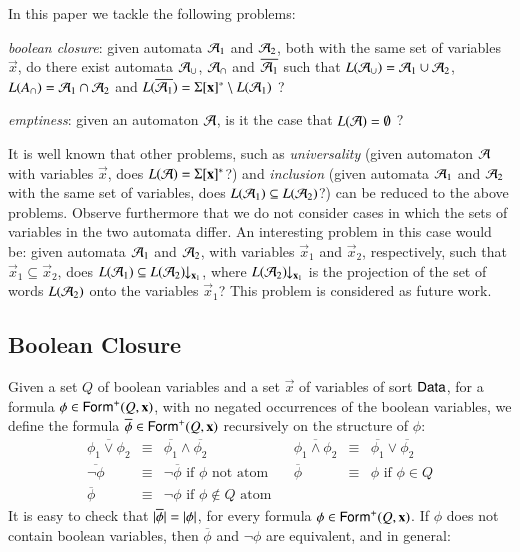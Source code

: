 \documentclass[10pt,conference,letterpaper,twocolumn]{IEEEtran}
\begin{document}
In this paper we tackle the following problems: \begin{compactenum}
\item \emph{boolean closure}: given automata $\mathcal{A}_1$ and $\mathcal{A}_2$, both
  with the same set of variables $\vec{x}$, do there exist automata
  $\mathcal{A}_\cup$, $\mathcal{A}_\cap$ and $\overline{\mathcal{A}_1}$ such that $L(\mathcal{A}_\cup) =
  \mathcal{A}_1 \cup \mathcal{A}_2$, $L(A_\cap) = \mathcal{A}_1 \cap \mathcal{A}_2$ and
  $L(\overline{\mathcal{A}_1}) = \Sigma[\mathbf x]^* \setminus L(\mathcal{A}_1)$ ?
%
\item \emph{emptiness}: given an automaton $\mathcal{A}$, is it the case that
  $L(\mathcal{A}) = \emptyset$ ?
\end{compactenum}

It is well known that other problems, such as \emph{universality}
(given automaton $\mathcal{A}$ with variables $\vec{x}$, does $L(\mathcal{A}) =
\Sigma[\mathbf x]^*$?) and \emph{inclusion} (given automata $\mathcal{A}_1$ and
$\mathcal{A}_2$ with the same set of variables, does $L(\mathcal{A}_1) \subseteq
L(\mathcal{A}_2)$?) can be reduced to the above problems. Observe furthermore
that we do not consider cases in which the sets of variables in the
two automata differ. An interesting problem in this case would be: given
automata $\mathcal{A}_1$ and $\mathcal{A}_2$, with variables $\vec{x}_1$ and
$\vec{x}_2$, respectively, such that $\vec{x}_1 \subseteq \vec{x}_2$,
does $L(\mathcal{A}_1) \subseteq {L(\mathcal{A}_2)}\!\!\downarrow_{{\mathbf x_1}}$, where
${L(\mathcal{A}_2)}\!\!\downarrow_{{\mathbf x_1}}$ is the projection of the set of words
$L(\mathcal{A}_2)$ onto the variables $\vec{x}_1$? This problem is considered
as future work.

\subsection{Boolean Closure}

Given a set $Q$ of boolean variables and a set $\vec{x}$ of variables
of sort $\mathsf{Data}$, for a formula $\phi \in \mathsf{Form}^+(Q,\mathbf x)$, with no
negated occurrences of the boolean variables, we define the formula
$\overline{\phi} \in \mathsf{Form}^+(Q,\mathbf x)$ recursively on the structure
of $\phi$:
\[\begin{array}{lclclcl}
\overline{\phi_1 \vee \phi_2} & \equiv & \overline{\phi_1} \wedge \overline{\phi_2} && 
\overline{\phi_1 \wedge \phi_2} & \equiv & \overline{\phi_1} \vee \overline{\phi_2} \\ 
\overline{\neg\phi} & \equiv & \neg \overline{\phi} \text{ if $\phi$ not atom} &&
\overline{\phi} & \equiv & \phi \text{ if $\phi \in Q$} \\
\overline{\phi} & \equiv & \neg\phi \text{ if $\phi \not\in Q$ atom}
\end{array}\]
It is easy to check that ${|{\overline{\phi}}|} = {|{\phi}|}$, for
every formula $\phi \in \mathsf{Form}^+(Q,\mathbf x)$. If $\phi$ does not
contain boolean variables, then $\overline{\phi}$ and $\neg\phi$ are
equivalent, and in general:
\end{document}
